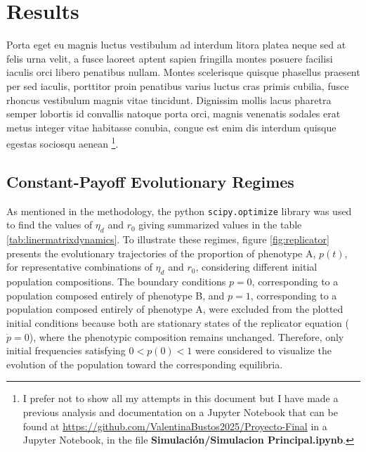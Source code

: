 \section{Results}

Porta eget eu magnis luctus vestibulum ad interdum litora platea neque sed at felis urna velit, a fusce laoreet aptent sapien fringilla montes posuere facilisi iaculis orci libero penatibus nullam. Montes scelerisque quisque phasellus praesent per sed iaculis, porttitor proin penatibus varius luctus cras primis cubilia, fusce rhoncus vestibulum magnis vitae tincidunt. Dignissim mollis lacus pharetra semper lobortis id convallis natoque porta orci, magnis venenatis sodales erat metus integer vitae habitasse conubia, congue est enim dis interdum quisque egestas sociosqu aenean \footnote{ I prefer not to show all my attempts in this document but I have made a previous analysis and documentation
on a Jupyter Notebook that can be found at \url{https://github.com/ValentinaBustos2025/Proyecto-Final} in a Jupyter Notebook, in the file
\textbf{Simulación/Simulacion Principal.ipynb}.}. \\


\subsection{Constant-Payoff Evolutionary Regimes}



As mentioned in the methodology, the python \texttt{scipy.optimize} library was used to find the values of  \(\eta_d\)  and  \(r_0\)  giving summarized values in the table \ref{tab:linermatrixdynamics}.  To illustrate these regimes, figure \ref{fig:replicator} presents the evolutionary trajectories of the proportion of phenotype A, \(p(t)\), for representative combinations of \(\eta_d\) and \(r_0\), considering different initial population compositions. The boundary conditions \(p=0\), corresponding to a population composed entirely of phenotype B, and \(p=1\), corresponding to a population composed entirely of phenotype A, were excluded from the plotted initial conditions because both are stationary states of the replicator equation (\(\dot{p}=0\)), where the phenotypic composition remains unchanged. Therefore, only initial frequencies satisfying \(0<p(0)<1\) were considered to visualize the evolution of the population toward the corresponding equilibria. 

